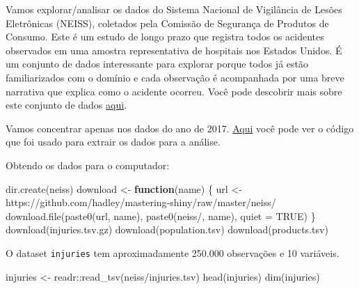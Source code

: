 \documentclass[
]{book}
\newenvironment{Shaded}{\begin{snugshade}}{\end{snugshade}}
\newcommand{\AttributeTok}[1]{\textcolor[rgb]{0.77,0.63,0.00}{#1}}
\newcommand{\ConstantTok}[1]{\textcolor[rgb]{0.00,0.00,0.00}{#1}}
\newcommand{\ControlFlowTok}[1]{\textcolor[rgb]{0.13,0.29,0.53}{\textbf{#1}}}
\newcommand{\FunctionTok}[1]{\textcolor[rgb]{0.00,0.00,0.00}{#1}}
\newcommand{\NormalTok}[1]{#1}
\newcommand{\OtherTok}[1]{\textcolor[rgb]{0.56,0.35,0.01}{#1}}
\newcommand{\SpecialCharTok}[1]{\textcolor[rgb]{0.00,0.00,0.00}{#1}}
\newcommand{\StringTok}[1]{\textcolor[rgb]{0.31,0.60,0.02}{#1}}
\begin{document}
Vamos explorar/analisar os dados do Sistema Nacional de Vigilância de Lesões Eletrônicas (NEISS), coletados pela Comissão de Segurança de Produtos de Consumo. Este é um estudo de longo prazo que registra todos os acidentes observados em uma amostra representativa de hospitais nos Estados Unidos. É um conjunto de dados interessante para explorar porque todos já estão familiarizados com o domínio e cada observação é acompanhada por uma breve narrativa que explica como o acidente ocorreu. Você pode descobrir mais sobre este conjunto de dados \href{https://github.com/hadley/neiss}{aqui}.

Vamos concentrar apenas nos dados do ano de 2017. \href{https://github.com/hadley/mastering-shiny/blob/master/neiss/data.R}{Aqui} você pode ver o código que foi usado para extrair os dados para a análise.

Obtendo os dados para o computador:

\begin{Shaded}
\begin{Highlighting}[]
\FunctionTok{dir.create}\NormalTok{(}\StringTok{\textquotesingle{}neiss\textquotesingle{}}\NormalTok{)}
\NormalTok{download }\OtherTok{\textless{}{-}} \ControlFlowTok{function}\NormalTok{(name) \{}
\NormalTok{ url }\OtherTok{\textless{}{-}} \StringTok{\textquotesingle{}https://github.com/hadley/mastering{-}shiny/raw/master/neiss/\textquotesingle{}}
 \FunctionTok{download.file}\NormalTok{(}\FunctionTok{paste0}\NormalTok{(url, name), }\FunctionTok{paste0}\NormalTok{(}\StringTok{\textquotesingle{}neiss/\textquotesingle{}}\NormalTok{, name), }\AttributeTok{quiet =} \ConstantTok{TRUE}\NormalTok{)}
\NormalTok{\}}
\FunctionTok{download}\NormalTok{(}\StringTok{\textquotesingle{}injuries.tsv.gz\textquotesingle{}}\NormalTok{)}
\FunctionTok{download}\NormalTok{(}\StringTok{\textquotesingle{}population.tsv\textquotesingle{}}\NormalTok{)}
\FunctionTok{download}\NormalTok{(}\StringTok{\textquotesingle{}products.tsv\textquotesingle{}}\NormalTok{)}
\end{Highlighting}
\end{Shaded}

O dataset \texttt{injuries} tem aproximadamente 250.000 observações e 10 variáveis.

\begin{Shaded}
\begin{Highlighting}[]
\NormalTok{injuries }\OtherTok{\textless{}{-}}\NormalTok{ readr}\SpecialCharTok{::}\FunctionTok{read\_tsv}\NormalTok{(}\StringTok{\textquotesingle{}neiss/injuries.tsv\textquotesingle{}}\NormalTok{)}
\FunctionTok{head}\NormalTok{(injuries)}
\FunctionTok{dim}\NormalTok{(injuries)}
\end{Highlighting}
\end{Shaded}
\end{document}
